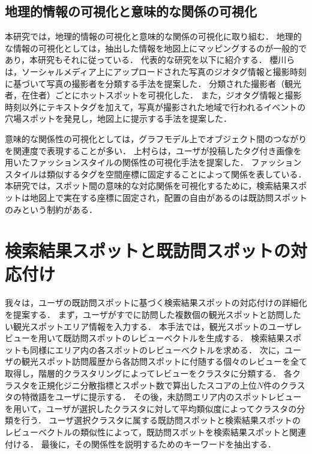 \documentclass{deimj}
\begin{document}
\subsection{地理的情報の可視化と意味的な関係の可視化}
本研究では，地理的情報の可視化と意味的な関係の可視化に取り組む．
地理的な情報の可視化としては，抽出した情報を地図上にマッピングするのが一般的であり，本研究もそれに従っている．
代表的な研究を以下に紹介する．
櫻川ら\cite{櫻川2015}は，ソーシャルメディア上にアップロードされた写真のジオタグ情報と撮影時刻に基づいて写真の撮影者を分類する手法を提案した．
分類された撮影者（観光者，在住者）ごとにホットスポットを可視化した．
また，ジオタグ情報と撮影時刻以外にテキストタグを加えて，写真が撮影された地域で行われるイベントの穴場スポットを発見し，地図上に提示する手法を提案した\cite{櫻川2016}．

意味的な関係性の可視化としては，グラフモデル上でオブジェクト間のつながりを関連度で表現することが多い．
上村ら\cite{上村}は，ユーザが投稿したタグ付き画像を用いたファッションスタイルの関係性の可視化手法を提案した．
ファッションスタイルは類似するタグを空間座標に固定することによって関係を表している．
本研究では，スポット間の意味的な対応関係を可視化するために，検索結果スポットは地図上で実在する座標に固定され，配置の自由があるのは既訪問スポットのみという制約がある．

\section{検索結果スポットと既訪問スポットの対応付け}
\label{sec:検索結果スポットと既訪問スポットの対応付け}
我々は，ユーザの既訪問スポットに基づく検索結果スポットの対応付けの詳細化を提案する．
まず，ユーザがすでに訪問した複数個の観光スポットと訪問したい観光スポットエリア情報を入力する．
本手法では，観光スポットのユーザレビューを用いて既訪問スポットのレビューベクトルを生成する．
検索結果スポットも同様にエリア内の各スポットのレビューベクトルを求める．
次に，ユーザの観光スポット訪問履歴から各訪問スポットに付随する個々のレビューを全て取得し，階層的クラスタリングによってレビューをクラスタに分類する．
各クラスタを正規化ジニ分散指標とスポット数で算出したスコアの上位$N$件のクラスタの特徴語をユーザに提示する．
その後，未訪問エリア内のスポットレビューを用いて，ユーザが選択したクラスタに対して平均類似度によってクラスタの分類を行う．
ユーザ選択クラスタに属する既訪問スポットと検索結果スポットのレビューベクトルの類似性によって，既訪問スポットを検索結果スポットと関連付ける．
最後に，その関係性を説明するためのキーワードを抽出する．
\end{document}

